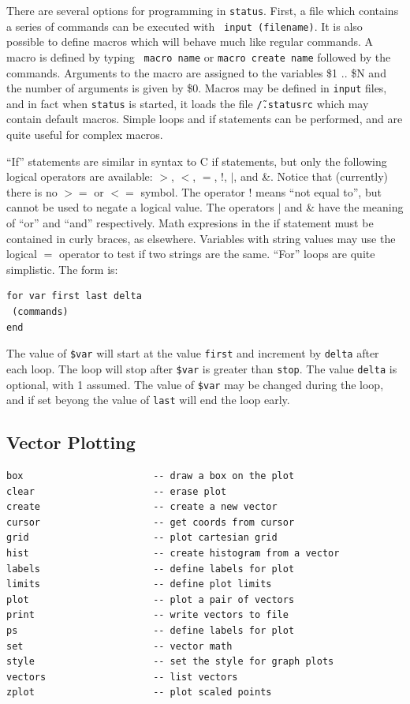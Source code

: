 \documentclass{article}
\begin{document}
There are several options for programming in {\tt status}.  First, a
file which contains a series of commands can be executed with {\tt
  input (filename)}.  It is also possible to define macros which will
behave much like regular commands.  A macro is defined by typing {\tt
  macro name} or {\tt macro create name} followed by the commands.
Arguments to the macro are assigned to the variables \$1 .. \$N and
the number of arguments is given by \$0.  Macros may be defined in
{\tt input} files, and in fact when {\tt status} is started, it loads
the file {\tt \~/.statusrc} which may contain default macros.  Simple
loops and if statements can be performed, and are quite useful for
complex macros.  

``If'' statements are similar in syntax to C if statements, but only
the following logical operators are available: $>$, $<$, $=$, !, $|$,
and \&.  Notice that (currently) there is no $>=$ or $<=$ symbol.  The
operator ! means ``not equal to'', but cannot be used to negate a
logical value.  The operators $|$ and \& have the meaning of ``or'' and
``and'' respectively.  Math expresions in the if statement must be
contained in curly braces, as elsewhere.  Variables with string values
may use the logical $=$ operator to test if two strings are the same.
``For'' loops are quite simplistic.  The form is:
\begin{verbatim}
for var first last delta
 (commands)
end
\end{verbatim}
The value of {\tt \$var} will start at the value {\tt first} and increment by
{\tt delta} after each loop.  The loop will stop after {\tt \$var} is greater
than {\tt stop}.  The value {\tt delta} is optional, with 1 assumed.
The value of {\tt \$var} may be changed during the loop, and if set
beyong the value of {\tt last} will end the loop early.  

\subsection{Vector Plotting}

\begin{verbatim}
box                       -- draw a box on the plot
clear                     -- erase plot
create                    -- create a new vector
cursor                    -- get coords from cursor
grid                      -- plot cartesian grid
hist                      -- create histogram from a vector
labels                    -- define labels for plot
limits                    -- define plot limits
plot                      -- plot a pair of vectors
print                     -- write vectors to file
ps                        -- define labels for plot
set                       -- vector math
style                     -- set the style for graph plots
vectors                   -- list vectors
zplot                     -- plot scaled points 
\end{verbatim}
\end{document}
